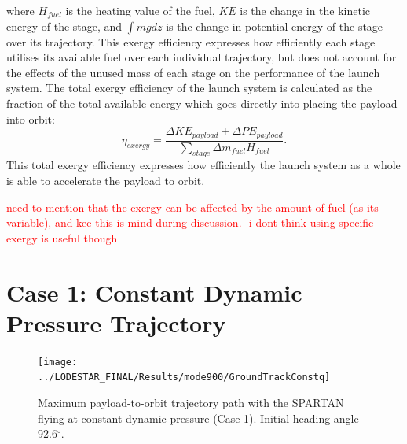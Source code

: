 where $H_{fuel}$ is the heating value of the fuel, $KE$ is the change in the kinetic energy of the stage, and $\int mg dz$ is the change in potential energy of the stage over its trajectory.
This exergy efficiency expresses how efficiently each stage utilises its available fuel over each individual trajectory, but does not account for the effects of the unused mass of each stage on the performance of the launch system. The total exergy efficiency of the launch system is calculated as the fraction of the total available energy which goes directly into placing the payload into orbit:
\begin{equation}
\eta_{exergy} = \frac{\Delta KE_{payload} + \Delta PE_{payload}}{\sum_{stage} \Delta m_{fuel}H_{fuel}}.
\end{equation}
This total exergy efficiency expresses how efficiently the launch system as a whole is able to accelerate the payload to orbit. 

\textcolor{red}{need to mention that the exergy can be affected by the amount of fuel (as its variable), and kee this is mind during discussion. -i dont think using specific exergy is  useful though}

\section{Case 1: Constant Dynamic Pressure Trajectory}
\begin{figure}[ht]
	\centering
	\texttt{[image: ../LODESTAR\_FINAL/Results/mode900/GroundTrackConstq]}
	\caption{Maximum payload-to-orbit trajectory path with the SPARTAN flying at constant dynamic pressure (Case 1). Initial heading angle 92.6$^\circ$.}
	\label{fig:GroundTrackConstq}
\end{figure}

